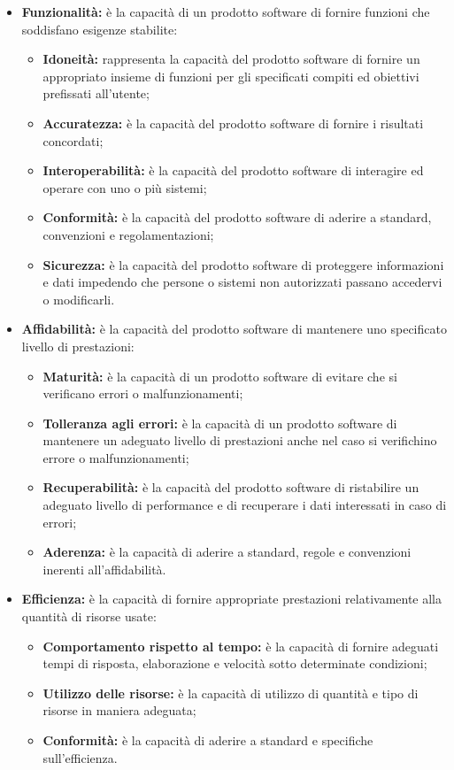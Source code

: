\begin{itemize}
\item \textbf{Funzionalità:} è la capacità di un prodotto software di fornire funzioni che soddisfano esigenze stabilite:

\begin{itemize}
	\item \textbf{Idoneità:}  rappresenta la capacità del prodotto software di fornire un appropriato insieme di funzioni per gli specificati compiti ed obiettivi prefissati all'utente;
	\item \textbf{Accuratezza:} è la capacità del prodotto software di fornire i risultati concordati;
	\item \textbf{Interoperabilità:} è la capacità del prodotto software di interagire ed operare con uno o più sistemi;
	\item \textbf{Conformità:} è la capacità del prodotto software di aderire a standard, convenzioni e regolamentazioni;
	\item \textbf{Sicurezza:} è la capacità del prodotto software di proteggere informazioni e dati impedendo che persone o sistemi non autorizzati passano accedervi o modificarli.
\end{itemize}

\item \textbf{Affidabilità:} è la capacità del prodotto software di mantenere uno specificato livello di prestazioni:
\begin{itemize}
	\item \textbf{Maturità:} è la capacità di un prodotto software di evitare che si verificano errori o malfunzionamenti;
	\item \textbf{Tolleranza agli errori:} è la capacità di un prodotto software di mantenere un adeguato livello di prestazioni anche nel caso si verifichino errore o malfunzionamenti;
	\item \textbf{Recuperabilità:} è la capacità del prodotto software di ristabilire un adeguato livello di performance e di recuperare i dati interessati in caso di errori;
	\item \textbf{Aderenza:} è la capacità di aderire a standard, regole e convenzioni inerenti all'affidabilità.
\end{itemize}

\item \textbf{Efficienza:} è la capacità di fornire appropriate prestazioni relativamente alla quantità di risorse usate:
\begin{itemize}
	\item \textbf{Comportamento rispetto al tempo:} è la capacità di fornire adeguati tempi di risposta, elaborazione e velocità sotto determinate condizioni;
	\item \textbf{Utilizzo delle risorse:} è la capacità di utilizzo di quantità e tipo di risorse in maniera adeguata;
	\item \textbf{Conformità:} è la capacità di aderire a standard e specifiche sull'efficienza.
\end{itemize}


\end{itemize}
